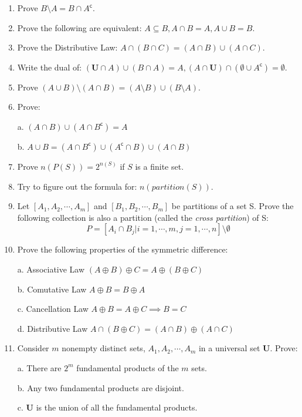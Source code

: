 \documentclass{article}
\newcommand{\setcomp}[1] {{#1}^{\mathsf{c}}}
\begin{document}
\begin{enumerate}
  \item Prove $B\setminus A = B\cap \setcomp{A}$.
  \item Prove the following are equivalent:
  $A\subseteq B, A \cap B = A, A\cup B = B$.

  \item Prove the Distributive Law:
  $A\cap(B\cap C) = (A\cap B)\cup (A\cap C)$.

  \item Write the dual of:
  $
  (\textbf{U} \cap A)\cup (B\cap A) = A,
  (A\cap \textbf{U})\cap (\emptyset \cup \setcomp{A}) = \emptyset
  $.

  \item Prove $(A\cup B)\setminus (A\cap B) = (A\setminus B)\cup (B\setminus A)$.

  \item Prove:

    a. $(A\cap B)\cup (A\cap \setcomp{B}) = A$

    b. $A\cup B = (A\cap \setcomp{B})\cup (\setcomp{A}\cap B)\cup (A\cap B)$

  \item Prove $n(P(S)) = 2^{n(S)}$ if $S$ is a finite set.

  \item Try to figure out the formula for: $n(partition(S))$.

  \item Let $[A_1, A_2, \cdots, A_m]$ and $[B_1, B_2, \cdots, B_m]$ be partitions of a set S.
  Prove the following collection is also a partition (called the \textsl{cross partition}) of S:
  $$
  P = [A_i\cap B_j | i = 1, \cdots, m, j = 1, \cdots, n]\setminus \emptyset
  $$

  \item Prove the following properties of the symmetric difference:

    a. Associative Law $(A\oplus B)\oplus C = A\oplus(B \oplus C)$

    b. Comutative Law $A\oplus B = B\oplus A$

    c. Cancellation Law $A\oplus B = A\oplus C \implies B = C$

    d. Distributive Law $A\cap (B\oplus C) = (A\cap B)\oplus (A\cap C)$

  \item Consider $m$ nonempty distinct sets, $A_1, A_2, \cdots, A_m$ in a universal set $\textbf{U}$. Prove:

    a. There are $2^m$ fundamental products of the $m$ sets.

    b. Any two fundamental products are disjoint.

    c. $\textbf{U}$ is the union of all the fundamental products.

\end{enumerate}
\end{document}
